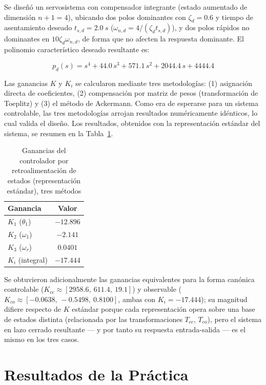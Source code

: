 \documentclass[conference]{IEEEtran}
\begin{document}
Se diseñó un servosistema con compensador integrante (estado aumentado de dimensión $n+1=4$), ubicando dos polos dominantes con $\zeta_d=0.6$ y tiempo de asentamiento deseado $t_{s,d}=\SI{2.0}{s}$ ($\omega_{n,d}=4/(\zeta_d t_{s,d})$), y dos polos rápidos no dominantes en $10\zeta_d\omega_{n,d}$, de forma que no afecten la respuesta dominante. El polinomio característico deseado resultante es:

\begin{equation}
p_d(s) = s^4 + 44.0\,s^3 + 571.1\,s^2 + 2044.4\,s + 4444.4
\end{equation}

Las ganancias $K$ y $K_i$ se calcularon mediante tres metodologías: (1) asignación directa de coeficientes, (2) compensación por matriz de pesos (transformación de Toeplitz) y (3) el método de Ackermann. Como era de esperarse para un sistema controlable, las tres metodologías arrojan resultados numéricamente idénticos, lo cual valida el diseño. Los resultados, obtenidos con la representación estándar del sistema, se resumen en la Tabla~\ref{tab:controlador}.

\begin{table}[H]
\centering
\caption{Ganancias del controlador por retroalimentación de estados (representación estándar), tres métodos}
\label{tab:controlador}
\renewcommand{\arraystretch}{1.3}
\begin{tabular}{|l|c|}
\hline
\textbf{Ganancia} & \textbf{Valor} \\
\hline
$K_1$ ($\theta_1$) & $-12.896$ \\
\hline
$K_2$ ($\omega_1$) & $-2.141$ \\
\hline
$K_3$ ($\omega_r$) & $0.0401$ \\
\hline
$K_i$ (integral) & $-17.444$ \\
\hline
\end{tabular}
\end{table}

Se obtuvieron adicionalmente las ganancias equivalentes para la forma canónica controlable ($K_{cc}\approx[2958.6,\ 611.4,\ 19.1]$) y observable ($K_{co}\approx[-0.0638,\ -0.5498,\ 0.8100]$, ambas con $K_i=-17.444$); su magnitud difiere respecto de $K$ estándar porque cada representación opera sobre una base de estados distinta (relacionada por las transformaciones $T_{cc}$, $T_{co}$), pero el sistema en lazo cerrado resultante --- y por tanto su respuesta entrada-salida --- es el mismo en los tres casos.


\section{Resultados de la Práctica}
\label{sec:resultados}
\end{document}
